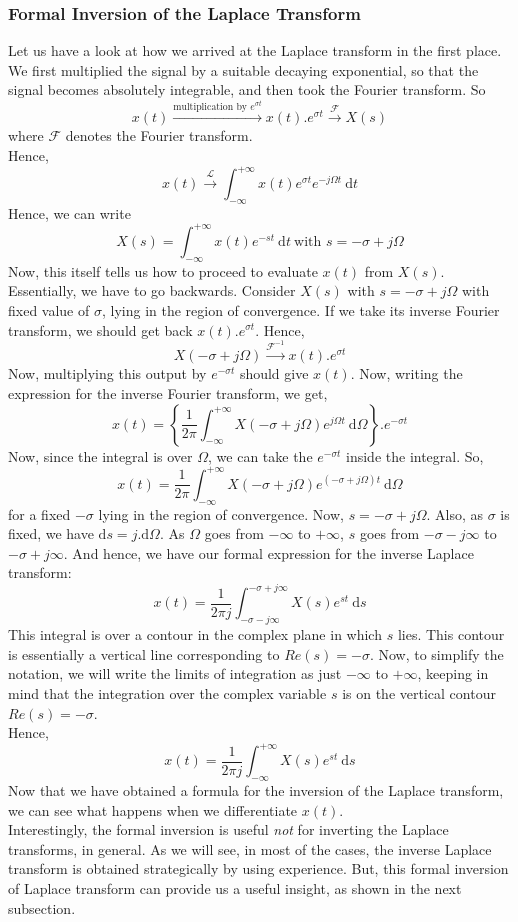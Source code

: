 \subsubsection{Formal Inversion of the Laplace Transform}
Let us have a look at how we arrived at the Laplace transform in the first place. We first multiplied the signal by a suitable decaying exponential, so that the signal becomes absolutely integrable, and then took the Fourier transform. So
\[
x(t) \xrightarrow{ \text{multiplication by } e^{\sigma t}} x(t).e^{\sigma t} \xrightarrow{ \mathcal{F} } X(s) 
\]
where $\mathcal{F}$ denotes the Fourier transform.\\
Hence,
\[
x(t) \xrightarrow{\mathcal{L}} \int_{-\infty}^{+\infty} \! x(t)e^{\sigma t} e^{-j\Omega t} \ \mathrm{d}t
\]
Hence, we can write
\[
X(s) = \int_{-\infty}^{+\infty} \! x(t)e^{-s t} \ \mathrm{d}t \ \text{with }s=-\sigma + j\Omega
\]
Now, this itself tells us how to proceed to evaluate $x(t)$ from $X(s)$. Essentially, we have to go backwards. Consider $X(s)$ with $s = -\sigma + j\Omega$ with fixed value of $\sigma$, lying in the region of convergence. If we take its inverse Fourier transform, we should get back $x(t).e^{\sigma t}$. Hence,
\[
X(-\sigma + j\Omega) \xrightarrow{\mathcal{F}^{-1}} x(t).e^{\sigma t}
\]
Now, multiplying this output by $e^{-\sigma t}$ should give $x(t)$. Now, writing the expression for the inverse Fourier transform, we get,
\[
x(t) = \left\lbrace \frac{1}{2\pi}\int_{-\infty}^{+\infty} \! X(-\sigma + j\Omega) e^{j\Omega t} \ \mathrm{d}\Omega \right\rbrace . e^{-\sigma t}
\]
Now, since the integral is over $\Omega$, we can take the $e^{-\sigma t}$ inside the integral. So,
\[
x(t) = \frac{1}{2\pi}\int_{-\infty}^{+\infty} \! X(-\sigma + j\Omega) e^{(-\sigma + j\Omega) t} \ \mathrm{d}\Omega
\]
for a fixed $-\sigma$ lying in the region of convergence. Now, $s=-\sigma+j\Omega$. Also, as $\sigma$ is fixed, we have $\mathrm{d}s = j. \mathrm{d}\Omega$. As $\Omega$ goes from $-\infty$ to $+\infty$, $s$ goes from $-\sigma-j\infty$ to $-\sigma+j\infty$. And hence, we have our formal expression for the inverse Laplace transform:
\[
x(t) = \frac{1}{2\pi j}\int_{-\sigma-j\infty}^{-\sigma+j\infty} \! X(s)e^{s t} \ \mathrm{d}s
\]
This integral is over a contour in the complex plane in which $s$ lies. This contour is essentially a vertical line corresponding to $Re(s)=-\sigma$. Now, to simplify the notation, we will write the limits of integration as just $-\infty$ to $+\infty$, keeping in mind that the integration over the complex variable $s$ is on the vertical contour $Re(s)=-\sigma$.\\ Hence,
\[
x(t) = \frac{1}{2\pi j}\int_{-\infty}^{+\infty} \! X(s)e^{s t} \ \mathrm{d}s
\]
Now that we have obtained a formula for the inversion of the Laplace transform, we can see what happens when we differentiate $x(t)$.\\
Interestingly, the formal inversion is useful \emph{not} for inverting the Laplace transforms, in general. As we will see, in most of the cases, the inverse Laplace transform is obtained strategically by using experience. But, this formal inversion of Laplace transform can provide us a useful insight, as shown in the next subsection. 
